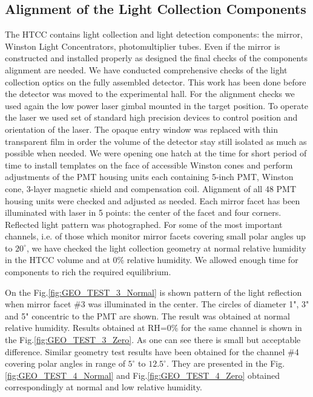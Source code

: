\subsection{Alignment of the Light Collection Components}
The HTCC contains light collection and light detection components: the mirror, Winston Light Concentrators, photomultiplier tubes. Even if the mirror is constructed and installed properly as designed the final checks of the components alignment are needed. We have conducted comprehensive checks of the light collection optics on the fully assembled detector. This work has been done before the detector was moved to the experimental hall. For the alignment checks we used again the low power laser gimbal mounted in the target position. To operate the laser we used set of standard high precision devices to control position and orientation of the laser. The opaque entry window was replaced with thin transparent film in order the volume of the detector stay still isolated as much as possible when needed. We were opening one hatch at the time for short period of time to install templates on the face of accessible Winston cones and perform adjustments of the PMT housing units each containing 5-inch PMT, Winston cone, 3-layer magnetic shield and compensation coil. Alignment of all 48 PMT housing units were checked and adjusted as needed. Each mirror facet has been illuminated with laser in 5 points: the center of the facet and four corners. Reflected light  pattern was photographed. For some of the most important channels, i.e. of those which monitor mirror facets covering small polar angles up to $20^\circ$, we have checked the light collection geometry at normal relative humidity in the HTCC volume and at 0\% relative humidity. We allowed enough time for components to rich the required equilibrium.

On the Fig.\ref{fig:GEO_TEST_3_Normal} is shown pattern of the light reflection when mirror facet \#3 was illuminated in the center. The circles of diameter 1", 3" and 5" concentric to the PMT are shown. The result was obtained at normal relative humidity. Results obtained at RH=0\% for the same channel is shown in the Fig.\ref{fig:GEO_TEST_3_Zero}. As one can see there is small but acceptable difference. Similar geometry test results have been obtained for the channel \#4 covering polar angles in range of $5^\circ$ to $12.5^\circ$. They are presented in the Fig.\ref{fig:GEO_TEST_4_Normal} and  Fig.\ref{fig:GEO_TEST_4_Zero} obtained correspondingly at normal and low relative humidity.

